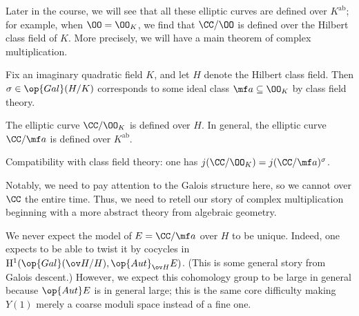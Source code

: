 \documentclass[../notes.tex]{subfiles}
\begin{document}
Later in the course, we will see that all these elliptic curves are defined over $K^{\mathrm{ab}}$; for example, when $\OO=\OO_K$, we find that $\CC/\OO$ is defined over the Hilbert class field of $K$. More precisely, we will have a main theorem of complex multiplication.
\begin{theorem} \label{thm:main-cm-1}
	Fix an imaginary quadratic field $K$, and let $H$ denote the Hilbert class field. Then $\sigma\in\op{Gal}(H/K)$ corresponds to some ideal class $\mf a\subseteq\OO_K$ by class field theory.
	\begin{listalph}
		\item The elliptic curve $\CC/\OO_K$ is defined over $H$. In general, the elliptic curve $\CC/\mf a$ is defined over $K^{\mathrm{ab}}$.
		\item Compatibility with class field theory: one has $j(\CC/\OO_K)=j(\CC/\mf a)^\sigma$.
	\end{listalph}
\end{theorem}
Notably, we need to pay attention to the Galois structure here, so we cannot over $\CC$ the entire time. Thus, we need to retell our story of complex multiplication beginning with a more abstract theory from algebraic geometry.
\begin{remark}
	We never expect the model of $E=\CC/\mf a$ over $H$ to be unique. Indeed, one expects to be able to twist it by cocycles in $\mathrm H^1(\op{Gal}(\ov H/H),\op{Aut}_{\ov H}E)$. (This is some general story from Galois descent.) However, we expect this cohomology group to be large in general because $\op{Aut}E$ is in general large; this is the same core difficulty making $Y(1)$ merely a coarse moduli space instead of a fine one.
\end{remark}
\end{document}
